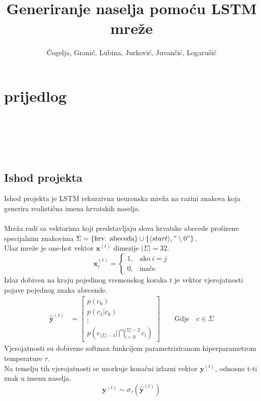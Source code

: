 \documentclass{report}
\title{Generiranje naselja pomoću LSTM mreže}
\author{Čogelja, Granić, Lubina, Jurković, Juvančić, Logarušić}
\begin{document}
\maketitle

\chapter*{prijedlog}
\ \\
\\
\\
\\

\section{Ishod projekta}
Ishod projekta je LSTM rekurzivna neuronska mreža na razini znakova koja generira realistična imena hrvatskih naselja.\\
\\
Mreža radi sa vektorima koji predstavljaju slova hrvatske abecede proširene specijalnim znakovima $\Sigma = \{ \text{hrv. abeceda}\} \cup \{\langle start \rangle, "\setminus 0"\}$.\\
Ulaz mreže je one-hot vektor $\mathbf{x}^{(t)}$ dimezije $\lvert \Sigma \rvert = 32$.
\begin{equation}
\mathbf{x}^{(t)}_i=
    \begin{cases}
      1, & \text{ako}\ i=j \\
      0, & \text{inače}
    \end{cases}
\end{equation}
Izlaz dobiven na kraju pojedinog vremenskog koraka $t$ je vektor vjerojatnosti pojave pojednog znaka abecende.\\
\begin{align}
    \hat{\mathbf{y}}^{(t)} &= \begin{bmatrix}
           p(c_0) \\
           p(c_1 | c_0) \\
           \vdots \\
           p(c_{\lvert \Sigma \rvert -1} | \bigcap_{i=0}^{\lvert \Sigma \rvert -2} c_i)
         \end{bmatrix}
         \quad \quad \text{Gdje} \quad c \in \Sigma
\end{align}
Vjerojatnosti su dobivene softmax funkcijom parametriziranom hiperparametrom temperature $\tau$.\\
Na temelju tih vjerojatnosti se uzorkuje konačni izlazni vektor $\mathbf{y}^{(t)}$, odnosno t-ti znak u imenu naselja.\\
\begin{equation}
 \mathbf{y}^{(t)} \sim \sigma_{\tau}(\hat{\mathbf{y}}^{(t)})
\end{equation}
\end{document}
